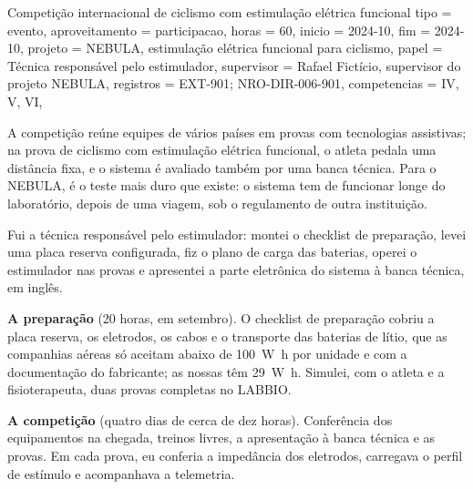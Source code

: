 \begin{atividade}{Competição internacional de ciclismo com estimulação elétrica funcional}{
  tipo         = evento,
  aproveitamento = participacao,
  horas        = 60,
  inicio       = 2024-10,
  fim          = 2024-10,
  projeto      = {NEBULA, estimulação elétrica funcional para ciclismo},
  papel        = {Técnica responsável pelo estimulador},
  supervisor   = {Rafael Fictício, supervisor do projeto NEBULA},
  registros    = {EXT-901; NRO-DIR-006-901},
  competencias = {IV, V, VI},
}

\begin{contexto}
A competição reúne equipes de vários países em provas com tecnologias assistivas; na prova de ciclismo
com estimulação elétrica funcional, o atleta pedala uma distância fixa, e o sistema é avaliado também
por uma banca técnica. Para o NEBULA, é o teste mais duro que existe: o sistema tem de funcionar longe
do laboratório, depois de uma viagem, sob o regulamento de outra instituição.
\end{contexto}

\begin{contribuicao}
Fui a técnica responsável pelo estimulador: montei o checklist de preparação, levei uma placa reserva
configurada, fiz o plano de carga das baterias, operei o estimulador nas provas e apresentei a parte
eletrônica do sistema à banca técnica, em inglês.
\end{contribuicao}

\begin{desenvolvimento}

\textbf{A preparação} (20 horas, em setembro). O checklist de preparação cobriu a placa reserva, os
eletrodos, os cabos e o transporte das baterias de lítio, que as companhias aéreas só aceitam abaixo de
\SI{100}{\watt\hour} por unidade e com a documentação do fabricante; as nossas têm
\SI{29}{\watt\hour}. Simulei, com o atleta e a fisioterapeuta, duas provas completas no LABBIO.

\textbf{A competição} (quatro dias de cerca de dez horas). Conferência dos equipamentos na chegada,
treinos livres, a apresentação à banca técnica e as provas. Em cada prova, eu conferia a impedância dos
eletrodos, carregava o perfil de estímulo e acompanhava a telemetria.
\end{desenvolvimento}


\end{atividade}
